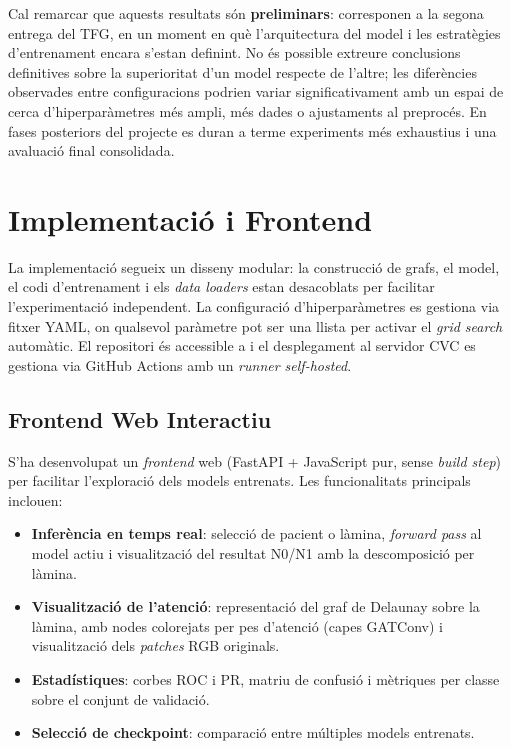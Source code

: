 \documentclass[10pt,a4paper,twocolumn,twoside]{article}
\begin{document}
Cal remarcar que aquests resultats són \textbf{preliminars}: corresponen a la segona entrega
del TFG, en un moment en què l'arquitectura del model i les estratègies d'entrenament encara
s'estan definint. No és possible extreure conclusions definitives sobre la superioritat d'un
model respecte de l'altre; les diferències observades entre configuracions podrien variar
significativament amb un espai de cerca d'hiperparàmetres més ampli, més dades o ajustaments
al preprocés. En fases posteriors del projecte es duran a terme experiments més exhaustius
i una avaluació final consolidada.

\section{Implementació i Frontend}

La implementació segueix un disseny modular: la construcció de grafs, el model, el codi d'entrenament i els
\textit{data loaders} estan desacoblats per facilitar l'experimentació independent. La configuració
d'hiperparàmetres es gestiona via fitxer YAML, on qualsevol paràmetre pot ser una llista per activar el
\textit{grid search} automàtic. El repositori és accessible a \cite{morillo2026codi} i el desplegament al
servidor CVC es gestiona via GitHub Actions amb un \textit{runner self-hosted}.

\subsection{Frontend Web Interactiu}

S'ha desenvolupat un \textit{frontend} web (FastAPI + JavaScript pur, sense \textit{build step}) per facilitar
l'exploració dels models entrenats. Les funcionalitats principals inclouen:

\begin{itemize}
    \item \textbf{Inferència en temps real}: selecció de pacient o làmina, \textit{forward pass} al model actiu
    i visualització del resultat N0/N1 amb la descomposició per làmina.
    \item \textbf{Visualització de l'atenció}: representació del graf de Delaunay sobre la làmina, amb nodes
    colorejats per pes d'atenció (capes GATConv) i visualització dels \textit{patches} RGB originals.
    \item \textbf{Estadístiques}: corbes ROC i PR, matriu de confusió i mètriques per classe sobre el conjunt
    de validació.
    \item \textbf{Selecció de checkpoint}: comparació entre múltiples models entrenats.
\end{itemize}
\end{document}

